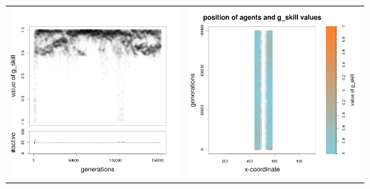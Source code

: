 \documentclass[a4paper,10pt]{article}
\begin{document}
\begin{table}[H]
\begin{tabular}{cc}
 \includegraphics[width=\imgSize]{../images/5StaticEnv/Gplot51_staticEnv3}&\includegraphics[width=\imgSize]{../images/5StaticEnv/Gplot51Static_staticEnv3}\\

\end{tabular}
\end{table}
\end{document}
